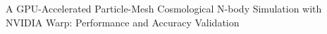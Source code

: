 \documentclass[]{article}
\begin{document}
A GPU-Accelerated Particle-Mesh Cosmological N-body Simulation with NVIDIA Warp: Performance and Accuracy Validation
\end{document}
